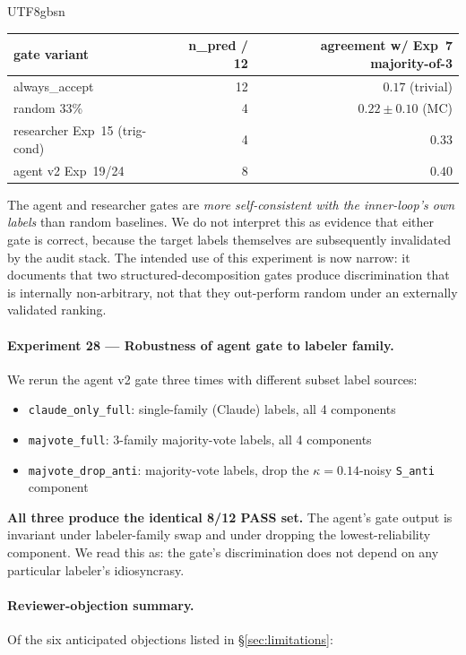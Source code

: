 \documentclass{article}
\begin{document}
\begin{CJK*}{UTF8}{gbsn}
\begin{center}\small
\begin{tabular}{l r r}
  \toprule
  gate variant & n\_pred / 12 & agreement w/ Exp~7 majority-of-3 \\
  \midrule
  always\_accept                  & 12 & \(0.17\) (trivial) \\
  random 33\%                      & 4  & \(0.22 \pm 0.10\) (MC) \\
  researcher Exp~15 (trig-cond)    & 4  & \(0.33\) \\
  agent v2 Exp~19/24               & 8  & \(0.40\) \\
  \bottomrule
\end{tabular}
\end{center}

The agent and researcher gates are \emph{more self-consistent with
the inner-loop's own labels} than random baselines. We do not
interpret this as evidence that either gate is correct, because the
target labels themselves are subsequently invalidated by the audit
stack. The intended use of this experiment is now narrow: it
documents that two structured-decomposition gates produce
discrimination that is internally non-arbitrary, not that they
out-perform random under an externally validated ranking.

\paragraph{Experiment 28 — Robustness of agent gate to labeler
family.} We rerun the agent v2 gate three times with different
subset label sources:
\begin{itemize}[leftmargin=*, topsep=1pt, itemsep=1pt]
  \item \texttt{claude\_only\_full}: single-family (Claude) labels,
    all 4 components
  \item \texttt{majvote\_full}: 3-family majority-vote labels, all
    4 components
  \item \texttt{majvote\_drop\_anti}: majority-vote labels, drop
    the \(\kappa=0.14\)-noisy \texttt{S\_anti} component
\end{itemize}

\textbf{All three produce the identical 8/12 PASS set.} The agent's
gate output is invariant under labeler-family swap and under dropping
the lowest-reliability component. We read this as: the gate's
discrimination does not depend on any particular labeler's idiosyncrasy.

\paragraph{Reviewer-objection summary.} Of the six anticipated
objections listed in \S\ref{sec:limitations}:


\end{CJK*}
\end{document}
